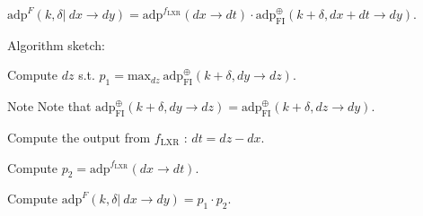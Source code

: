 $\mathrm{adp}^{F}(k, \delta |~ dx \rightarrow dy) = \mathrm{adp}^{f_\mathrm{LXR}}(dx \rightarrow dt) \cdot \mathrm{adp}^{\oplus}_{\mathrm{FI}}(k + \delta, dx + dt \rightarrow dy)$.

\-Algorithm sketch\-:
\begin{DoxyEnumerate}
\item \-Compute $dz$ s.\-t. $p_1 = \mathrm{max}_{dz}~\mathrm{adp}^{\oplus}_{\mathrm{FI}}(k + \delta, dy \rightarrow dz)$. \begin{DoxyNote}{\-Note}
\-Note that $\mathrm{adp}^{\oplus}_{\mathrm{FI}}(k + \delta, dy \rightarrow dz) = \mathrm{adp}^{\oplus}_{\mathrm{FI}}(k + \delta, dz \rightarrow dy)$.
\end{DoxyNote}

\item \-Compute the output from $f_{\mathrm{LXR}}$ \-: $dt = dz - dx$.
\item \-Compute $p_2 = \mathrm{adp}^{f_\mathrm{LXR}}(dx \rightarrow dt)$.
\item \-Compute $\mathrm{adp}^{F}(k, \delta |~ dx \rightarrow dy) = p_1 \cdot p_2$.
\end{DoxyEnumerate}


